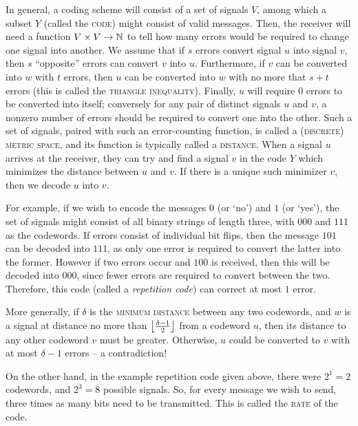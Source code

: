 \documentclass{report}
\begin{document}
    In general, a coding scheme will consist of a set of signals $V$, among
    which a subset $Y$ (called the \textsc{code}) might consist of valid
    messages.  Then, the receiver will need a function $V \times V \to \mathbb{N}$ to
    tell how many errors would be required to change one signal into another.
    We assume that if $s$ errors convert signal $u$ into signal $v$, then $s$
    ``opposite'' errors can convert $v$ into $u$.  Furthermore, if $v$ can be
    converted into $w$ with $t$ errors, then $u$ can be converted into $w$ with
    no more that $s + t$ errors (this is called the \textsc{triangle
    inequality}).  Finally, $u$ will require $0$ errors to be converted into
    itself; conversely for any pair of distinct signals $u$ and $v$, a nonzero
    number of errors should be required to convert one into the other.  Such a
    set of signals, paired with such an error-counting function, is called a
    \textsc{(discrete) metric space}, and its function is typically called a
    \textsc{distance}.  When a signal $u$ arrives at the receiver, they can try
    and find a signal $v$ in the code $Y$ which minimizes the distance between
    $u$ and $v$.  If there is a unique such minimizer $v$, then we decode $u$
    into $v$.

    For example, if we wish to encode the messages $0$ (or `no') and $1$ (or
    `yes'), the set of signals might consist of all binary strings of length
    three, with $000$ and $111$ as the codewords.  If errors consist of
    individual bit flips, then the message $101$ can be decoded into $111$, as
    only one error is required to convert the latter into the former.  However
    if two errors occur and $100$ is received, then this will be decoded into
    $000$, since fewer errors are required to convert between the two.
    Therefore, this code (called a \textit{repetition code}) can correct at most
    $1$ error.

    More generally, if $\delta$ is the \textsc{minimum distance} between any two
    codewords, and $w$ is a signal at distance no more than $\left\lfloor \frac{\delta
    - 1}{2} \right\rfloor$ from a codeword $u$, then its distance to any other codeword $v$
    must be greater.  Otherwise, $u$ could be converted to $v$ with at most
    $\delta - 1$ errors -- a contradiction!

    On the other hand, in the example repetition code given above, there were
    $2^1 = 2$ codewords, and $2^3 = 8$ possible signals.  So, for every message
    we wish to send, three times as many bits need to be transmitted.  This is
    called the \textsc{rate} of the code.
\end{document}

